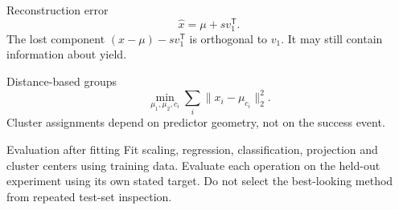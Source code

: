 \documentclass[aspectratio=169,11pt]{beamer}
\newcommand{\notestarget}{notes.pdf}\newcommand{\noteslabel}{Notes}
\begin{document}
\renewcommand{\notestarget}{notes.pdf\#note-principal-components}
\begin{frame}[t,fragile,label=slide-reconstruction-error]{Reconstruction error}
\[
\widehat x=\mu+sv_1^{\mathsf T}.
\]
\pause{}
The lost component $(x-\mu)-sv_1^{\mathsf T}$ is orthogonal to $v_1$. It may still contain information about yield.
\end{frame}
\renewcommand{\notestarget}{notes.pdf\#note-distance-based-groups}
\begin{frame}[t,fragile,label=slide-distance-based-groups]{Distance-based groups}
\[
\min_{\mu_1,\mu_2,c_i}\sum_i\|x_i-\mu_{c_i}\|_2^2.
\]
\pause{}
Cluster assignments depend on predictor geometry, not on the success event.
\end{frame}
\renewcommand{\notestarget}{notes.pdf\#note-regression-and-classification-errors}
\begin{frame}[t,fragile,label=slide-evaluation-after-fitting]{Evaluation after fitting}
Fit scaling, regression, classification, projection and cluster centers using training data.
\pause{}
Evaluate each operation on the held-out experiment using its own stated target. Do not select the best-looking method from repeated test-set inspection.
\end{frame}
\end{document}
